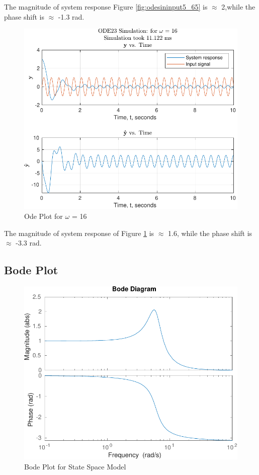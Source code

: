 \documentclass[12pt]{article}
\begin{document}
		The magnitude of system response Figure \ref{fig:odesininput5_65} is $\approx$ 2,while the phase shift is $\approx$ -1.3 rad.
		\begin{figure}[H]
			\centering
			\includegraphics[width=1\linewidth]{Code/Fig/ode_sin_input_16}
			\caption{Ode Plot for $\omega$ = 16}
			\label{fig:odesininput16}
		\end{figure}		
		The magnitude of system response of Figure \ref{fig:odesininput16} is $\approx$ 1.6, while the phase shift is $\approx$  -3.3 rad.
		
		\newpage
		\subsection{Bode Plot}
		
		
		\begin{figure}[H]
			\centering
			\includegraphics[width=1\linewidth]{Code/Fig/bode_plot}
			\caption{Bode Plot for State Space Model}
			\label{fig:bodeplot}
		\end{figure}
	
\end{document}
